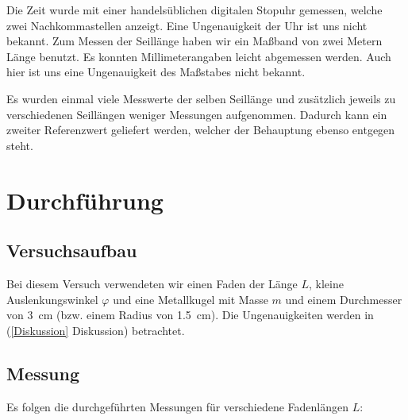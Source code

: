 \documentclass[11pt,a4paper,titlepage, ngerman]{article}
\begin{document}
		Die Zeit wurde mit einer handelsüblichen digitalen Stopuhr gemessen, welche zwei Nachkommastellen anzeigt.
		Eine Ungenauigkeit der Uhr ist uns nicht bekannt.
		Zum Messen der Seillänge haben wir ein Maßband von zwei Metern Länge benutzt. Es konnten Millimeterangaben leicht abgemessen werden.
		Auch hier ist uns eine Ungenauigkeit des Maßstabes nicht bekannt.
		
		Es wurden einmal viele Messwerte der selben Seillänge und zusätzlich jeweils zu verschiedenen Seillängen weniger Messungen aufgenommen.
		Dadurch kann ein zweiter Referenzwert geliefert werden, welcher der Behauptung ebenso entgegen steht.
		
		
		
	
	\section{Durchführung}
		\label{Durchführung}
		
		\subsection{Versuchsaufbau}
		\label{Versuchsaufbau}
			
			Bei diesem Versuch verwendeten wir einen Faden der Länge $L$, kleine Auslenkungswinkel $\varphi$ und eine Metallkugel mit Masse $m$ und einem Durchmesser von \SI{3}{cm} (bzw. einem Radius von \SI{1,5}{cm}). Die Ungenauigkeiten werden in (\ref{Diskussion} Diskussion) betrachtet.
			\vspace{0.25cm}
		
		\subsection{Messung}
		\label{Messung}
			Es folgen die durchgeführten Messungen für verschiedene Fadenlängen $L$: 
			\vspace{0.25cm} 
			
\end{document}
